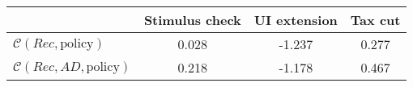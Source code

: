 \begin{tabular}{@{}lccc@{}} 
\toprule 
                          & Stimulus check      & UI extension    & Tax cut    \\  \midrule 
$\mathcal{C}(Rec,\text{policy})$ & 0.028  & -1.237  & 0.277     \\ 
$\mathcal{C}(Rec, AD,\text{policy})$ & 0.218  & -1.178  & 0.467     \\ 
\end{tabular}  
